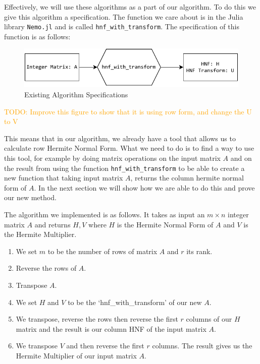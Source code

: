 \documentclass[oneside, a4paper, onecolumn, 11pt]{article}
\newcommand{\todo}[1]{
    \begin{mdframed}
        \textcolor{orange}{
        TODO: #1
        }
    \end{mdframed}
}
\begin{document}
Effectively, we will use these algorithms as a part of our algorithm. To do this we give this algorithm a specification. The function we care about is in the Julia library \texttt{Nemo.jl} \cite{nemo} and is called \texttt{hnf\_with\_transform}. The specification of this function is as follows:
\begin{figure}[H]
    \centering
    \includegraphics{images/diagram1.pdf}
    \caption{Existing Algorithm Specifications}
    \label{fig:existingalgo}
\end{figure}
\todo{Improve this figure to show that it is using row form, and change the U to V}

This means that in our algorithm, we already have a tool that allows us to calculate row Hermite Normal Form. What we need to do is to find a way to use this tool, for example by doing matrix operations on the input matrix \(A\) and on the result from using the function \texttt{hnf\_with\_transform} to be able to create a new function that taking input matrix \(A\), returns the column hermite normal form of \(A\). In the next section we will show how we are able to do this and prove our new method.

The algorithm we implemented is as follows. It takes as input an \(m \times n\) integer matrix \(A\) and returns \(H, V\) where \(H\) is the Hermite Normal Form of \(A\) and \(V\) is the Hermite Multiplier.
\begin{enumerate}
    \item We set \(m\) to be the number of rows of matrix \(A\) and \(r\) its rank.
    \item Reverse the rows of \(A\).
    \item Transpose \(A\).
    \item We set \(H\) and \(V\) to be the `hnf\_with\_transform' of our new \(A\).
    \item We transpose, reverse the rows then reverse the first \(r\) columns of our \(H\) matrix and the result is our column HNF of the input matrix \(A\).
    \item We transpose \(V\) and then reverse the first \(r\) columns. The result gives us the Hermite Multiplier of our input matrix \(A\).
\end{enumerate}
\end{document}
